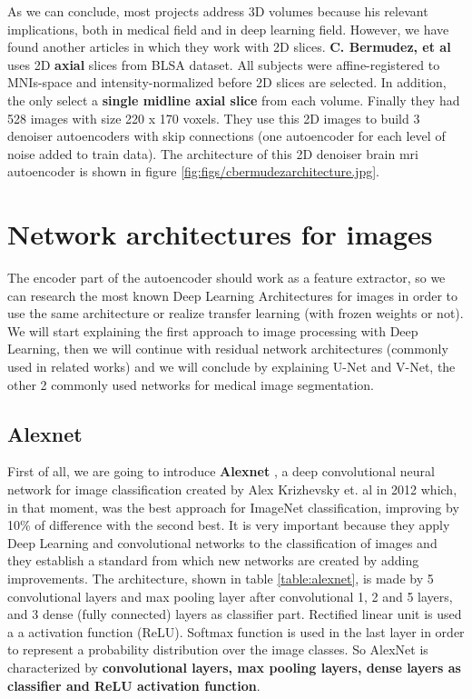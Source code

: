 As we can conclude, most projects address 3D volumes because his relevant implications, both in medical field and in deep learning field. However, we have found another articles in which they work with 2D slices. \textbf{C. Bermudez, et al} \cite{bermudez2018t1autoencoder} uses 2D \textbf{axial} slices from BLSA dataset. All subjects were affine-registered to MNIs-space and intensity-normalized before 2D slices are selected. In addition, the only select a \textbf{single midline axial slice} from each volume. Finally they had 528 images with size 220 x 170 voxels. They use this 2D images to build 3 denoiser autoencoders with skip connections (one autoencoder for each level of noise added to train data). The architecture of this 2D denoiser brain mri autoencoder is shown in figure \ref{fig:figs/cbermudezarchitecture.jpg}.


\FloatBarrier
\clearpage



\section{Network architectures for images}

The encoder part of the autoencoder should work as a feature extractor, so we can research the most known Deep Learning Architectures for images in order to use the same architecture or realize transfer learning (with frozen weights or not). We will start explaining the first approach to image processing with Deep Learning, then we will continue with residual network architectures (commonly used in related works) and we will conclude by explaining U-Net and V-Net, the other 2 commonly used networks for medical image segmentation.

\subsection{Alexnet}

First of all, we are going to introduce \textbf{Alexnet} \cite{alexnet}, a deep convolutional neural network for image classification created by Alex Krizhevsky et. al in 2012 which, in that moment, was the best approach for ImageNet classification, improving by 10\% of difference with the second best. It is very important because they apply Deep Learning and convolutional networks to the classification of images and they establish a standard from which new networks are created by adding improvements. The architecture, shown in table \ref{table:alexnet}, is made by 5 convolutional layers and max pooling layer after convolutional 1, 2 and 5 layers, and 3 dense (fully connected) layers as classifier part. Rectified linear unit is used a a activation function (ReLU). Softmax function is used in the last layer in order to represent a probability distribution over the image classes. So AlexNet is characterized by \textbf{convolutional layers, max pooling layers, dense layers as classifier and ReLU activation function}.

